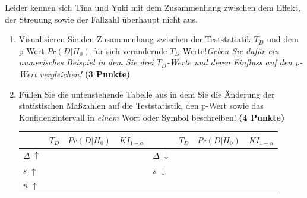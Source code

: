 \documentclass[a4paper, 9pt]{scrartcl}\usepackage[]{graphicx}\usepackage[]{xcolor}
\begin{document}
\vspace{1ex}

Leider kennen sich Tina und Yuki mit dem Zusammenhang zwischen dem Effekt, der Streuung sowie der Fallzahl überhaupt nicht aus. 


\begin{enumerate}
\item Visualisieren Sie den Zusammenhang zwischen der Teststatiatik $T_{D}$ und dem p-Wert $Pr(D|H_0)$ für sich verändernde $T_{D}$-Werte!\textit{Geben Sie dafür ein numerisches Beispiel in dem Sie drei $T_{D}$-Werte und deren Einfluss auf den p-Wert vergleichen!} \textbf{(3 Punkte)}  
\item  Füllen Sie die untenstehende Tabelle aus in dem Sie die Änderung der statistischen Maßzahlen auf die Teststatistik, den p-Wert sowie das Konfidenzintervall in \textit{einem} Wort oder Symbol beschreiben! \textbf{(4 Punkte)}
\begin{center}
  \large
  \begin{tabular}[c]{l|c|c|c|l|c|c|c}
    & $T_{D}$ & $Pr(D|H_0)$ & $KI_{1-\alpha}$ & & $T_{D}$ & $Pr(D|H_0)$ & $KI_{1-\alpha}$\strut\\ 
    \hline
    \textbf{$\Delta\; \uparrow$} & \hspace{1.8cm} & \hspace{1.8cm}  & \hspace{1.8cm} & \textbf{
                                                          $\Delta\; \downarrow$} &
                                                                          \hspace{1.8cm} & \hspace{1.8cm}  & \hspace{1.8cm}\strut\\
    \hline
        \textbf{$s\; \uparrow$} & \hspace{1.8cm} & \hspace{1.8cm}  & \hspace{1.8cm} & \textbf{
                                                          $s\; \downarrow$} &
                                                                          \hspace{1.8cm}
                                                & \hspace{1.8cm}  & \hspace{1.8cm}\strut\\
    \hline
        \textbf{$n\; \uparrow$} & \hspace{1.8cm} & \hspace{1.8cm}  & \hspace{1.8cm} & \textbf{
}
\end{tabular}
\end{center}
\end{enumerate}
\end{document}
